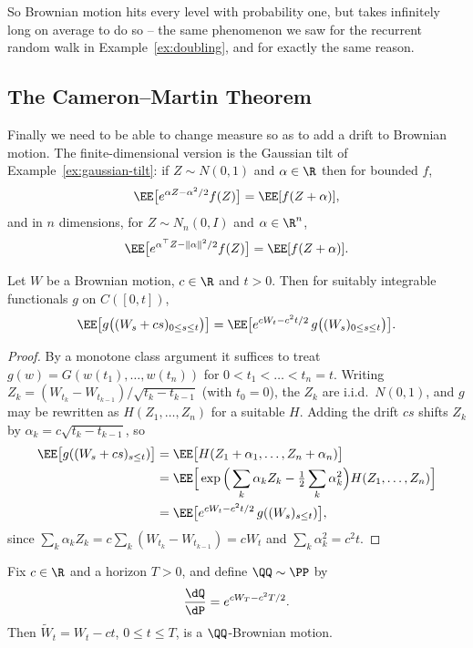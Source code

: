 So Brownian motion hits every level with probability one, but takes infinitely long on average to do so -- the same phenomenon we saw for the recurrent random walk in Example~\ref{ex:doubling}, and for exactly the same reason.

\subsection{The Cameron--Martin Theorem}

Finally we need to be able to change measure so as to add a drift to Brownian motion. The finite-dimensional version is the Gaussian tilt of Example~\ref{ex:gaussian-tilt}: if $Z\sim N(0,1)$ and $\alpha\in\R$ then for bounded $f$,
$$
\EE\big[e^{\alpha Z - \alpha^2/2}f(Z)\big] = \EE[f(Z+\alpha)],
$$
and in $n$ dimensions, for $Z\sim N_n(0,I)$ and $\alpha\in\R^n$,
$$
\EE\big[e^{\alpha^\top Z - \|\alpha\|^2/2}f(Z)\big] = \EE[f(Z+\alpha)].
$$

\begin{theorem}\label{thm:cameron-martin}
	Let $W$ be a Brownian motion, $c\in\R$ and $t>0$. Then for suitably integrable functionals $g$ on $C([0,t])$,
	$$
	\EE\big[g\big((W_s + cs)_{0\leq s\leq t}\big)\big] = \EE\big[e^{cW_t - c^2t/2}\,g\big((W_s)_{0\leq s\leq t}\big)\big].
	$$
\end{theorem}

\begin{proof}
	By a monotone class argument it suffices to treat $g(w) = G(w(t_1),\dots,w(t_n))$ for $0<t_1<\dots<t_n = t$. Writing $Z_k = (W_{t_k}-W_{t_{k-1}})/\sqrt{t_k - t_{k-1}}$ (with $t_0=0$), the $Z_k$ are i.i.d.\ $N(0,1)$, and $g$ may be rewritten as $H(Z_1,\dots,Z_n)$ for a suitable $H$. Adding the drift $cs$ shifts $Z_k$ by $\alpha_k = c\sqrt{t_k - t_{k-1}}$, so
	\begin{align*}
		\EE\big[g((W_s+cs)_{s\leq t})\big] &= \EE\big[H(Z_1+\alpha_1,\dots,Z_n+\alpha_n)\big]\\
		&= \EE\Big[\exp\Big(\sum_k \alpha_kZ_k - \tfrac12\sum_k\alpha_k^2\Big)H(Z_1,\dots,Z_n)\Big]\\
		&= \EE\big[e^{cW_t - c^2t/2}\,g((W_s)_{s\leq t})\big],
	\end{align*}
	since $\sum_k\alpha_kZ_k = c\sum_k(W_{t_k}-W_{t_{k-1}}) = cW_t$ and $\sum_k\alpha_k^2 = c^2t$.
\end{proof}

\begin{corollary}\label{cor:girsanov}
	Fix $c \in \R$ and a horizon $T>0$, and define $\QQ\sim\PP$ by
	$$
	\frac{\dQ}{\dP} = e^{cW_T - c^2T/2}.
	$$
	Then $\tilde W_t = W_t - ct$, $0\leq t\leq T$, is a $\QQ$-Brownian motion.
\end{corollary}

